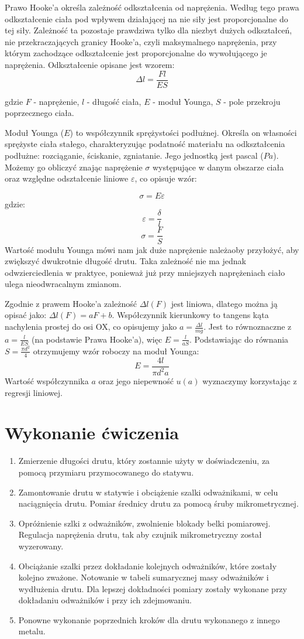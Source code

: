 \documentclass[a4paper,10pt,twoside]{article}
\begin{document}
Prawo Hooke'a określa zależność odkształcenia od naprężenia. Według tego prawa odkształcenie ciała pod wpływem działającej na nie siły jest proporcjonalne do tej siły. Zależność ta pozostaje prawdziwa tylko dla niezbyt dużych odkształceń, nie przekraczających granicy Hooke'a, czyli maksymalnego naprężenia, przy którym zachodzące odkształcenie jest proporcjonalne do wywołującego je naprężenia. Odkształcenie opisane jest wzorem:
$$ \Delta l = \frac{Fl}{ES} $$

gdzie $ F $ - naprężenie, $ l $ - długość ciała, $ E $ - moduł Younga, $ S $ - pole przekroju poprzecznego ciała.

Moduł Younga ($E$) to współczynnik sprężystości podłużnej. Określa on własności sprężyste ciała stałego, charakteryzując podatność materiału na odkształcenia podłużne: rozciąganie, ściskanie, zgniatanie. Jego jednostką jest pascal ($\unit{Pa}$). Możemy go obliczyć znając naprężenie $\sigma$ występujące w danym obszarze ciała oraz względne odształcenie liniowe $\varepsilon$, co opisuje wzór:


$$ \sigma = E \varepsilon $$
gdzie:
$$ \varepsilon = \frac{\delta}{l}$$
$$\sigma = \frac{F}{S}$$
Wartość modułu Younga mówi nam jak duże naprężenie należaoby przyłożyć, aby zwiększyć dwukrotnie długość drutu. Taka zależność nie ma jednak odwzierciedlenia w praktyce, ponieważ już przy mniejszych naprężeniach ciało ulega nieodwracalnym zmianom.

Zgodnie z prawem Hooke'a zależność $\Delta l(F)$ jest liniowa, dlatego można ją opisać jako: $\Delta l(F)=aF+b$. Współczynnik kierunkowy to tangens kąta nachylenia prostej do osi OX, co opisujemy jako $a=\frac{\Delta l}{mg}$. Jest to równoznaczne z $a=\frac{l}{ES}$ (na podstawie Prawa Hooke'a), więc
$E=\frac{l}{aS}$. Podstawiając do równania $S=\frac{\pi d^2}{4}$ otrzymujemy wzór roboczy na moduł Younga:
$$E = \frac{4l}{\pi d^2 a}$$
Wartość współczynnika $a$ oraz jego niepewność $u(a)$ wyznaczymy korzystając z regresji liniowej.
\section{Wykonanie ćwiczenia}
\begin{enumerate}
	\item Zmierzenie długości drutu, który zostannie użyty w doświadczeniu, za pomocą przymiaru przymocowanego do statywu.
	\item Zamontowanie drutu w statywie i obciążenie szalki odważnikami, w celu naciągnięcia drutu. Pomiar średnicy drutu za pomocą śruby mikrometrycznej.
	\item Opróżnienie szlki z odważników, zwolnienie blokady belki pomiarowej. Regulacja naprężenia drutu, tak aby czujnik mikrometryczny został wyzerowany.
	\item Obciążanie szalki przez dokładanie kolejnych odważników, które zostały kolejno zważone. Notowanie w tabeli sumarycznej masy odważników i wydłużenia drutu. Dla lepszej dokładności pomiary zostały wykonane przy dokładaniu odważników i przy ich zdejmowaniu.
	\item Ponowne wykonanie poprzednich kroków dla drutu wykonanego z innego metalu.
\end{enumerate}
\end{document}

